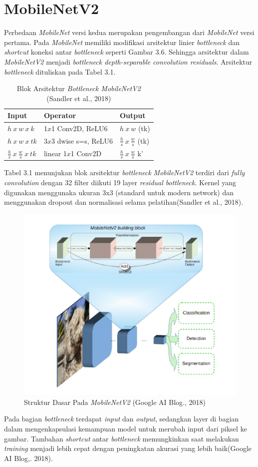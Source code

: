 \section{MobileNetV2}
Perbedaan \emph{MobileNet} versi kedua merupakan pengembangan dari \emph{MobileNet} versi pertama. Pada \emph{MobileNet} memiliki modifikasi arsitektur linier \emph{bottleneck} dan \emph{shortcut} koneksi antar \emph{bottleneck} seperti Gambar 3.6.
Sehingga arsitektur dalam \emph{MobileNetV2} menjadi \emph{bottleneck depth-separable convolution residuals}. Arsitektur \emph{bottleneck} dituliskan pada Tabel 3.1.
\begin{table}[H]
	\caption{Blok Arsitektur \emph{Bottleneck MobileNetV2} (Sandler et al., 2018)}
	\vspace{0.2cm}
	\centering
	\begin{tabular}{|p{3cm}|p{4cm}|p{3cm}|}
		\hline
		Input & Operator & Output \\
		\hline
		$h \ x \ w \ x \ k$ & 1$x$1 Conv2D, ReLU6 & $h \ x \ w$ (tk) \\ 
		\hline	
		$h \ x \ w \ x \ tk$ & 3$x$3 dwise s=s, ReLU6 & $\frac{h}{s} \ x \ \frac{w}{s}$ (tk) \\ 
		\hline	
		$\frac{h}{s} \ x \ \frac{w}{s} \ x \ tk$ & linear 1$x$1 Conv2D & $\frac{h}{s} \ x \ \frac{w}{s}$ k' \\ 
		\hline				
	\end{tabular}
\end{table}
Tabel 3.1 menunjukan blok arsitektur \emph{bottleneck} \emph{MobileNetV2} terdiri dari \emph{fully convolution} dengan 32 filter diikuti 19 layer \emph{residual bottleneck}.
Kernel yang digunakan menggunaka ukuran 3x3 (standard untuk modern network) dan menggunakan dropout dan normalisasi selama pelatihan(Sandler et al., 2018). 
\begin{figure}[H]
	\centering
	\includegraphics[width=0.6\linewidth]{"arsitektur"}
	\caption{Struktur Dasar Pada \emph{MobileNetV2} (Google AI Blog., 2018)}
	\label{fig:arsitektur}
\end{figure}
\noindent Pada bagian \emph{bottleneck} terdapat \emph{input} dan \emph{output}, sedangkan layer di bagian dalam mengenkapsulasi kemampuan model untuk merubah input dari piksel ke gambar. Tambahan \emph{shortcut} antar \emph{bottleneck} memungkinkan saat melakukan \emph{training} menjadi lebih cepat dengan peningkatan akurasi yang lebih baik(Google AI Blog,. 2018).
